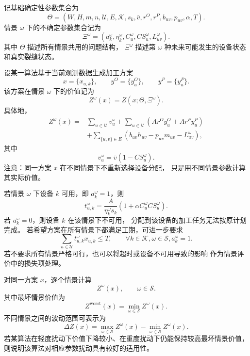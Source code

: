 ﻿\documentclass[UTF8,12pt,a4paper]{ctexart}
\begin{document}
\begin{description}[leftmargin=2em,labelsep=0.5em,itemsep=0.8em]
  \item[\textbf{基础参数与情景参数：}]
记基础确定性参数集合为
\[
\Theta=
\left(
W,H,m,n,\mathcal U,E,\mathcal K,
s_k,\bar v,r^O,r^P,b_{uv},p_{uv},\alpha,T
\right).
\]
情景 \(\omega\) 下的不确定参数集合记为
\[
\Xi^\omega=
\left(
a_k^\omega,\eta_k^\omega,
C_u^\omega,CS_u^\omega,L_{uv}^\omega
\right).
\]
其中 \(\Theta\) 描述所有情景共用的问题结构，
\(\Xi^\omega\) 描述第 \(\omega\) 种未来可能发生的设备状态和真实裂缝状态。

  \item[\textbf{同一方案的情景价值：}]
设某一算法基于当前观测数据生成加工方案
\[
x=\{x_{u,k}\},\qquad
y^O=\{y_u^O\},\qquad
y^P=\{y_u^P\}.
\]
该方案在情景 \(\omega\) 下的价值记为
\[
Z^\omega(x)=Z(x;\Theta,\Xi^\omega).
\]
具体地，
\[
\boxed{
\begin{aligned}
Z^\omega(x)
={}&
\sum_{u\in\mathcal U}v_u^\omega
+
\sum_{u\in\mathcal U}
\left(
A r^O y_u^O
+A r^P y_u^P
\right)\\
&+
\sum_{\{u,v\}\in E}
\left(
b_{uv}h_{uv}
-p_{uv}m_{uv}
-L_{uv}^{\omega}
\right),
\end{aligned}
}
\]
其中
\[
v_u^\omega=\bar v(1-CS_u^\omega).
\]
注意：同一方案 \(x\) 在不同情景下不重新选择设备分配，
只是用不同情景参数计算其实际价值。

  \item[\textbf{情景下加工时间与可行性：}]
若情景 \(\omega\) 下设备 \(k\) 可用，即 \(a_k^\omega=1\)，则
\[
t_{u,k}^{\omega}
=
\frac{A}{\eta_k^\omega s_k}
\left(1+\alpha C_u^\omega CS_u^\omega\right).
\]
若 \(a_k^\omega=0\)，则设备 \(k\) 在该情景下不可用，
分配到该设备的加工任务无法按原计划完成。
若希望方案在所有情景下都满足工期，可进一步要求
\[
\sum_{u\in\mathcal U}t_{u,k}^{\omega}x_{u,k}
\le T,
\qquad
\forall k\in\mathcal K,
\omega\in\mathcal S,
 a_k^\omega=1.
\]
若不要求所有情景严格可行，也可以将超时或设备不可用导致的影响
作为情景评价中的损失项处理。

  \item[\textbf{多情景评价指标：}]
对同一方案 \(x\)，逐个情景计算
\[
Z^\omega(x),
\qquad
\omega\in\mathcal S.
\]
其中最坏情景价值为
\[
Z^{\mathrm{worst}}(x)
=
\min_{\omega\in\mathcal S}Z^\omega(x).
\]
不同情景之间的波动范围可表示为
\[
\Delta Z(x)
=
\max_{\omega\in\mathcal S}Z^\omega(x)
-
\min_{\omega\in\mathcal S}Z^\omega(x).
\]
若某算法在轻度扰动下价值下降较小、在重度扰动下仍能保持较高最坏情景价值，
则说明该算法对相应参数扰动具有较好的适用性。
\end{description}
\end{document}
